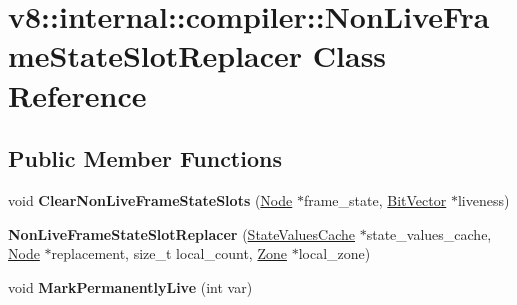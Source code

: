 \hypertarget{classv8_1_1internal_1_1compiler_1_1_non_live_frame_state_slot_replacer}{}\section{v8\+:\+:internal\+:\+:compiler\+:\+:Non\+Live\+Frame\+State\+Slot\+Replacer Class Reference}
\label{classv8_1_1internal_1_1compiler_1_1_non_live_frame_state_slot_replacer}
\subsection*{Public Member Functions}
\begin{DoxyCompactItemize}
\item 
void {\bfseries Clear\+Non\+Live\+Frame\+State\+Slots} (\hyperlink{classv8_1_1internal_1_1compiler_1_1_node}{Node} $\ast$frame\+\_\+state, \hyperlink{classv8_1_1internal_1_1_bit_vector}{Bit\+Vector} $\ast$liveness)\hypertarget{classv8_1_1internal_1_1compiler_1_1_non_live_frame_state_slot_replacer_a6a85a05d27ee30919f290647d5687eb8}{}\label{classv8_1_1internal_1_1compiler_1_1_non_live_frame_state_slot_replacer_a6a85a05d27ee30919f290647d5687eb8}

\item 
{\bfseries Non\+Live\+Frame\+State\+Slot\+Replacer} (\hyperlink{classv8_1_1internal_1_1compiler_1_1_state_values_cache}{State\+Values\+Cache} $\ast$state\+\_\+values\+\_\+cache, \hyperlink{classv8_1_1internal_1_1compiler_1_1_node}{Node} $\ast$replacement, size\+\_\+t local\+\_\+count, \hyperlink{classv8_1_1internal_1_1_zone}{Zone} $\ast$local\+\_\+zone)\hypertarget{classv8_1_1internal_1_1compiler_1_1_non_live_frame_state_slot_replacer_ad0c388062576a8af8d584038fe2cad28}{}\label{classv8_1_1internal_1_1compiler_1_1_non_live_frame_state_slot_replacer_ad0c388062576a8af8d584038fe2cad28}

\item 
void {\bfseries Mark\+Permanently\+Live} (int var)\hypertarget{classv8_1_1internal_1_1compiler_1_1_non_live_frame_state_slot_replacer_a4b58a054709f0658f2c2eacbfee9b7ba}{}\label{classv8_1_1internal_1_1compiler_1_1_non_live_frame_state_slot_replacer_a4b58a054709f0658f2c2eacbfee9b7ba}

\end{DoxyCompactItemize}

